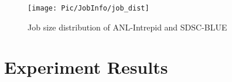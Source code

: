 \documentclass[conference]{IEEEtran}
\begin{document}
\begin{figure}[h!] 
  \centering
  \texttt{[image: Pic/JobInfo/job\_dist]}
   \caption{Job size distribution of ANL-Intrepid and SDSC-BLUE }
   \label{fig:jobsizeintowtraces}
\end{figure}



\fi



\section{Experiment Results}
\label{sec:scheduling results}
%
%
%
%
%
%
%
%
%
\end{document}
